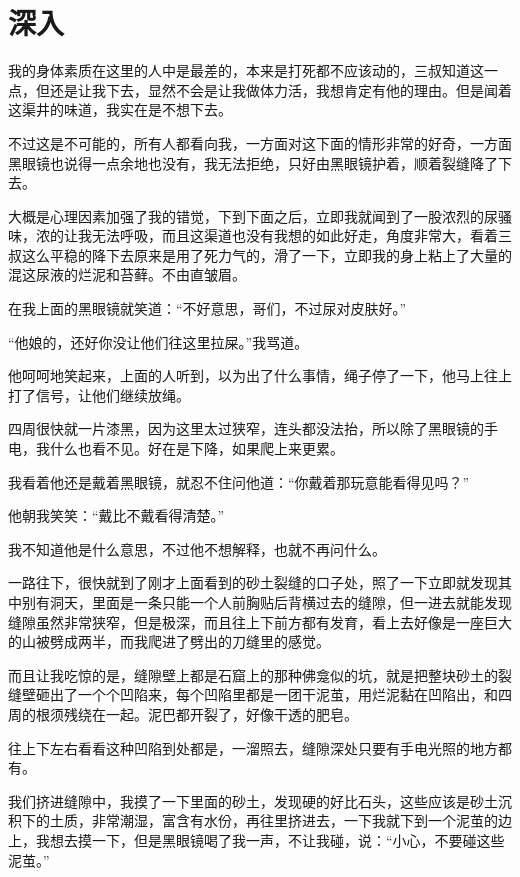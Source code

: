 \chapter{深入}

我的身体素质在这里的人中是最差的，本来是打死都不应该动的，三叔知道这一点，但还是让我下去，显然不会是让我做体力活，我想肯定有他的理由。但是闻着这渠井的味道，我实在是不想下去。

不过这是不可能的，所有人都看向我，一方面对这下面的情形非常的好奇，一方面黑眼镜也说得一点余地也没有，我无法拒绝，只好由黑眼镜护着，顺着裂缝降了下去。

大概是心理因素加强了我的错觉，下到下面之后，立即我就闻到了一股浓烈的尿骚味，浓的让我无法呼吸，而且这渠道也没有我想的如此好走，角度非常大，看着三叔这么平稳的降下去原来是用了死力气的，滑了一下，立即我的身上粘上了大量的混这尿液的烂泥和苔藓。不由直皱眉。

在我上面的黑眼镜就笑道：“不好意思，哥们，不过尿对皮肤好。”

“他娘的，还好你没让他们往这里拉屎。”我骂道。

他呵呵地笑起来，上面的人听到，以为出了什么事情，绳子停了一下，他马上往上打了信号，让他们继续放绳。

四周很快就一片漆黑，因为这里太过狭窄，连头都没法抬，所以除了黑眼镜的手电，我什么也看不见。好在是下降，如果爬上来更累。

我看着他还是戴着黑眼镜，就忍不住问他道：“你戴着那玩意能看得见吗？”

他朝我笑笑：“戴比不戴看得清楚。”

我不知道他是什么意思，不过他不想解释，也就不再问什么。

一路往下，很快就到了刚才上面看到的砂土裂缝的口子处，照了一下立即就发现其中别有洞天，里面是一条只能一个人前胸贴后背横过去的缝隙，但一进去就能发现缝隙虽然非常狭窄，但是极深，而且往上下前方都有发育，看上去好像是一座巨大的山被劈成两半，而我爬进了劈出的刀缝里的感觉。

而且让我吃惊的是，缝隙壁上都是石窟上的那种佛龛似的坑，就是把整块砂土的裂缝壁砸出了一个个凹陷来，每个凹陷里都是一团干泥茧，用烂泥黏在凹陷出，和四周的根须残绕在一起。泥巴都开裂了，好像干透的肥皂。

往上下左右看看这种凹陷到处都是，一溜照去，缝隙深处只要有手电光照的地方都有。

我们挤进缝隙中，我摸了一下里面的砂土，发现硬的好比石头，这些应该是砂土沉积下的土质，非常潮湿，富含有水份，再往里挤进去，一下我就下到一个泥茧的边上，我想去摸一下，但是黑眼镜喝了我一声，不让我碰，说：“小心，不要碰这些泥茧。”

